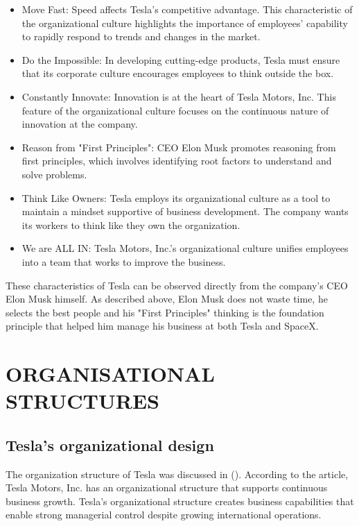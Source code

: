 \documentclass[12pt]{article}
\begin{document}
\begin{itemize}
	\item{Move Fast: Speed affects Tesla’s competitive advantage. This characteristic of the organizational culture highlights the importance of employees’ capability to rapidly respond to trends and changes in the market.}

	\item{Do the Impossible: In developing cutting-edge products, Tesla must ensure that its corporate culture encourages employees to think outside the box.}

	\item{Constantly Innovate: Innovation is at the heart of Tesla Motors, Inc. This feature of the organizational culture focuses on the continuous nature of innovation at the company.}

	\item{Reason from "First Principles": CEO Elon Musk promotes reasoning from first principles, which involves identifying root factors to understand and solve problems.}

	\item{Think Like Owners: Tesla employs its organizational culture as a tool to maintain a mindset supportive of business development. The company wants its workers to think like they own the organization.}

	\item{We are ALL IN: Tesla Motors, Inc.’s organizational culture unifies employees into a team that works to improve the business.}
\end{itemize}

These characteristics of Tesla can be observed directly from the company's CEO Elon Musk himself. As described above, Elon Musk does not waste time, he selects the best people and his "First Principles" thinking is the foundation principle that helped him manage his business at both Tesla and SpaceX.

\section{ORGANISATIONAL STRUCTURES}

\subsection{Tesla's organizational design}

The organization structure of Tesla was discussed in (\cite{me17b}). According to the article, Tesla Motors, Inc. has an organizational structure that supports continuous business growth. Tesla’s organizational structure creates business capabilities that enable strong managerial control despite growing international operations.
\end{document}
